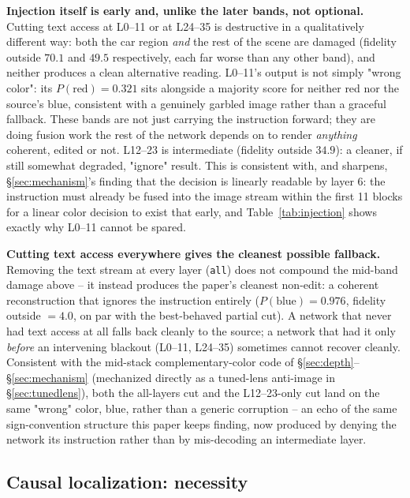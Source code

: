 \documentclass[10pt,twocolumn]{article}
\begin{document}
\textbf{Injection itself is early and, unlike the later bands, not
optional.} Cutting text access at L0--11 or at L24--35 is destructive in a
qualitatively different way: both the car region \emph{and} the rest of
the scene are damaged (fidelity outside $70.1$ and $49.5$ respectively,
each far worse than any other band), and neither produces a clean
alternative reading. L0--11's output is not simply "wrong color": its
$P(\text{red})=0.321$ sits alongside a majority score for neither red nor
the source's blue, consistent with a genuinely garbled image rather than
a graceful fallback. These bands are not just carrying the instruction
forward; they are doing fusion work the rest of the network depends on to
render \emph{anything} coherent, edited or not. L12--23 is intermediate
(fidelity outside $34.9$): a cleaner, if still somewhat degraded, "ignore"
result. This is consistent with, and sharpens, \S\ref{sec:mechanism}'s
finding that the decision is linearly readable by layer 6: the instruction
must already be fused into the image stream within the first 11 blocks
for a linear color decision to exist that early, and Table~\ref{tab:injection}
shows exactly why L0--11 cannot be spared.

\textbf{Cutting text access everywhere gives the cleanest possible
fallback.} Removing the text stream at every layer (\texttt{all}) does not
compound the mid-band damage above -- it instead produces the paper's
cleanest non-edit: a coherent reconstruction that ignores the instruction
entirely ($P(\text{blue})=0.976$, fidelity outside $=4.0$, on par with the
best-behaved partial cut). A network that never had text access at all
falls back cleanly to the source; a network that had it only \emph{before}
an intervening blackout (L0--11, L24--35) sometimes cannot recover
cleanly. Consistent with the mid-stack complementary-color code of
\S\ref{sec:depth}--\S\ref{sec:mechanism} (mechanized directly as a
tuned-lens anti-image in \S\ref{sec:tunedlens}), both the all-layers cut
and the L12--23-only cut land on the same "wrong" color, blue, rather
than a generic corruption -- an echo of the same sign-convention
structure this paper keeps finding, now produced by denying the network
its instruction rather than by mis-decoding an intermediate layer.
\subsection{Causal localization: necessity}\label{sec:causal}
\end{document}
